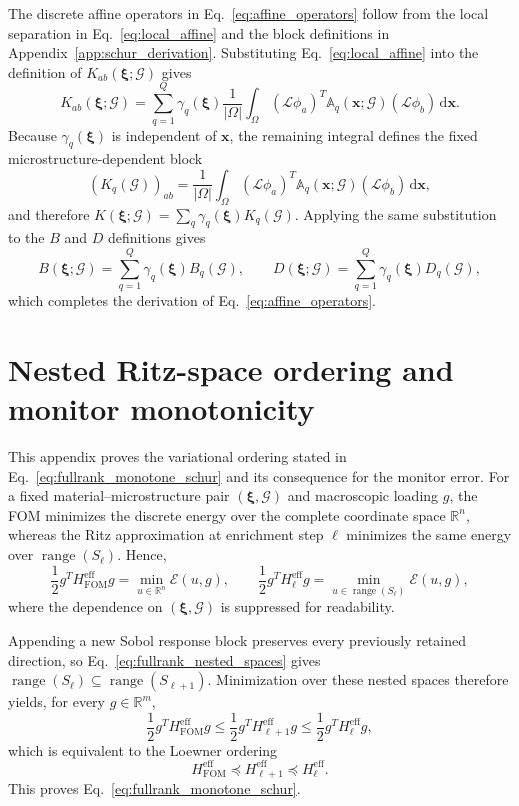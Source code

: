 \documentclass[pdflatex,sn-basic,Numbered]{sn-jnl}
\newcommand{\R}{\mathbb{R}}
\newcommand{\G}{\mathcal{G}}
\newcommand{\Hfom}{H^{\mathrm{eff}}_{\mathrm{FOM}}}
\begin{document}
The discrete affine operators in Eq.~\eqref{eq:affine_operators} follow from
the local separation in Eq.~\eqref{eq:local_affine} and the block definitions
in Appendix~\ref{app:schur_derivation}. Substituting
Eq.~\eqref{eq:local_affine} into the definition of
\(K_{ab}(\boldsymbol\xi;\G)\) gives
\[
K_{ab}(\boldsymbol\xi;\G)
=
\sum_{q=1}^{Q}
\gamma_q(\boldsymbol\xi)
\frac{1}{|\Omega|}
\int_{\Omega}
(\mathcal L\phi_a)^T
\mathbb A_q(\boldsymbol x;\G)
(\mathcal L\phi_b)
\,\mathrm d\boldsymbol x.
\]
Because \(\gamma_q(\boldsymbol\xi)\) is independent of
\(\boldsymbol x\), the remaining integral defines the fixed
microstructure-dependent block
\[
(K_q(\G))_{ab}
=
\frac{1}{|\Omega|}
\int_{\Omega}
(\mathcal L\phi_a)^T
\mathbb A_q(\boldsymbol x;\G)
(\mathcal L\phi_b)
\,\mathrm d\boldsymbol x,
\]
and therefore
\(K(\boldsymbol\xi;\G)
=\sum_q\gamma_q(\boldsymbol\xi)K_q(\G)\).
Applying the same substitution to the \(B\) and \(D\) definitions gives
\[
B(\boldsymbol\xi;\G)
=
\sum_{q=1}^{Q}
\gamma_q(\boldsymbol\xi)B_q(\G),
\qquad
D(\boldsymbol\xi;\G)
=
\sum_{q=1}^{Q}
\gamma_q(\boldsymbol\xi)D_q(\G),
\]
which completes the derivation of Eq.~\eqref{eq:affine_operators}.

\section{Nested Ritz-space ordering and monitor monotonicity}
\label{app:ritz_ordering}

This appendix proves the variational ordering stated in
Eq.~\eqref{eq:fullrank_monotone_schur} and its consequence for the monitor
error. For a fixed material--microstructure pair
\((\boldsymbol\xi,\G)\) and macroscopic loading \(g\), the FOM minimizes the
discrete energy over the complete coordinate space \(\R^n\), whereas the Ritz
approximation at enrichment step \(\ell\) minimizes the same energy over
\(\operatorname{range}(S_\ell)\). Hence,
\[
\frac{1}{2}g^T\Hfom g
=
\min_{u\in\R^n}\mathcal E(u,g),
\qquad
\frac{1}{2}g^TH_\ell^{\mathrm{eff}}g
=
\min_{u\in\operatorname{range}(S_\ell)}\mathcal E(u,g),
\]
where the dependence on \((\boldsymbol\xi,\G)\) is suppressed for
readability.

Appending a new Sobol response block preserves every previously retained
direction, so Eq.~\eqref{eq:fullrank_nested_spaces} gives
\(\operatorname{range}(S_\ell)\subseteq
\operatorname{range}(S_{\ell+1})\). Minimization over these nested spaces
therefore yields, for every \(g\in\R^m\),
\[
\frac{1}{2}g^T\Hfom g
\leq
\frac{1}{2}g^TH_{\ell+1}^{\mathrm{eff}}g
\leq
\frac{1}{2}g^TH_\ell^{\mathrm{eff}}g,
\]
which is equivalent to the Loewner ordering
\[
\Hfom
\preceq
H_{\ell+1}^{\mathrm{eff}}
\preceq
H_\ell^{\mathrm{eff}}.
\]
This proves Eq.~\eqref{eq:fullrank_monotone_schur}.
\end{document}
